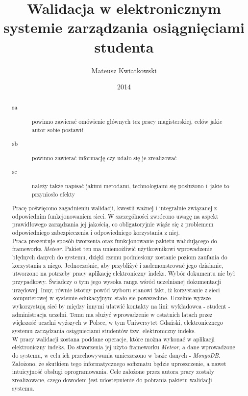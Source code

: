 \documentclass[brudnopis]{xmgr}
\author   {Mateusz Kwiatkowski}
\title    {Walidacja w elektronicznym systemie zarządzania osiągnięciami studenta}
\date     {2014}
\begin{document}
\begin{abstract}

\begin{description}
\item[sa] \textcolor{sa}{powinno zawierać omówienie głównych 
tez pracy magisterskiej, celów jakie autor sobie postawił} 
\item[sb] \textcolor{sb}{powinno zawierać informację czy udało 
  się je zrealizować}
\item[sc] \textcolor{sc}{należy także napisać jakimi metodami,
  technologiami się posłużono i~jakie to przyniosło efekty}
\end{description}

\textcolor{sa}{Pracę poświęcono zagadnieniu walidacji, kwestii ważnej i integralnie związanej z odpowiednim funkcjonowaniem sieci.
W szczególności zwrócono uwagę na aspekt prawidłowego zarządzania jej jakością, co obligatoryjnie wiąże się z problemem
odpowiedniego zabezpieczenia i odpowiedniego korzystania z niej.}
\\
\textcolor{sa}{Praca prezentuje sposób tworzenia oraz funkcjonowanie pakietu walidującego do frameworka \textit{Meteor}. Pakiet ten
ma uniemożliwić użytkownikowi wprowadzenie błędnych danych do systemu, dzięki czemu podniesiony zostanie poziom zaufania
do korzystania z niego. Jednocześnie, aby przybliżyć i zademonstrować jego działanie, utworzono na potrzeby pracy aplikację elektroniczny indeks.
Wybór dokumentu nie był przypadkowy. Świadczy o tym jego wysoka ranga wśród uczelnianej dokumentacji urzędowej. Inny, równie istotny powód
wyboru stanowi fakt, iż korzystanie z sieci komputerowej w systemie edukacyjnym stało sie powszechne. Uczelnie wyższe wykorzystują sieć by
między innymi ułatwić kontakty na lini: wykładowca - student - administracja uczelni.  Temu ma służyć wprowadzenie w ostatnich latach przez
większość uczelni wyższych w Polsce, w tym Uniwersytet Gdański, elektronicznego systemu zarządzania osiągnieciami studentów
tzw. elektroniczny indeks.}
\\
\textcolor{sc}{W pracy walidacji zostana poddane operacje, które można wykonać w aplikacji elektroniczny indeks. Do stworzenia jej użyto frameworku \textit{Meteor}, a dane wprowadzone do systemu, w celu ich przechowywania umieszczono w bazie danych - \textit{MongoDB}.}
\\
\textcolor{sb}{Założono, że skutkiem tego informatycznego sofizmatu będzie uproszczenie, a nawet intuicyjność obsługi oprogramowania. Cele założone przez autora pracy zostały zrealizowane, czego dowodem jest udostepnienie do pobrania pakietu walidacji systemu.}

\end{abstract}
\end{document}
